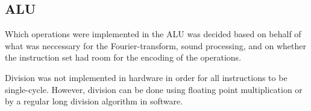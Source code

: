\FloatBarrier
\subsection{ALU}\label{subsec:fpga-alu}

Which operations were implemented in the ALU was decided based on behalf of what
was neccessary for the Fourier-transform, sound processing, and on whether the
instruction set had room for the encoding of the operations.

Division was not implemented in hardware in order for all instructions to be
single-cycle. However, division can be done using floating point multiplication
or by a regular long division algorithm in software.
